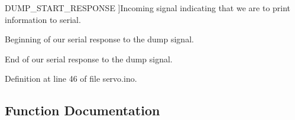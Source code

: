\begin{Desc}
\begin{description}
{\hypertarget{servo_8ino_a99fb83031ce9923c84392b4e92f956b5a51975080564db9aa29bff29cce328b5f}{}D\+U\+M\+P\+\_\+\+S\+T\+A\+R\+T\+\_\+\+R\+E\+S\+P\+O\+N\+S\+E\label{servo_8ino_a99fb83031ce9923c84392b4e92f956b5a51975080564db9aa29bff29cce328b5f}
}]Incoming signal indicating that we are to print information to serial. \item[{\em 
\hypertarget{servo_8ino_a99fb83031ce9923c84392b4e92f956b5aa7ca295335eb71b345d3b0bd0e53277e}{}D\+U\+M\+P\+\_\+\+E\+N\+D\+\_\+\+R\+E\+S\+P\+O\+N\+S\+E\label{servo_8ino_a99fb83031ce9923c84392b4e92f956b5aa7ca295335eb71b345d3b0bd0e53277e}
}]Beginning of our serial response to the dump signal. \item[{\em 
\hypertarget{servo_8ino_a99fb83031ce9923c84392b4e92f956b5aebe1616f434c26e10f088aebf559d708}{}D\+U\+M\+P\+\_\+\+R\+E\+S\+P\+O\+N\+S\+E\+\_\+\+L\+E\+N\label{servo_8ino_a99fb83031ce9923c84392b4e92f956b5aebe1616f434c26e10f088aebf559d708}
}]End of our serial response to the dump signal. \end{description}
\end{Desc}


Definition at line 46 of file servo.\+ino.



\subsection{Function Documentation}
\hypertarget{servo_8ino_accd2600060dbaee3a3b41aed4034c63c}{}
